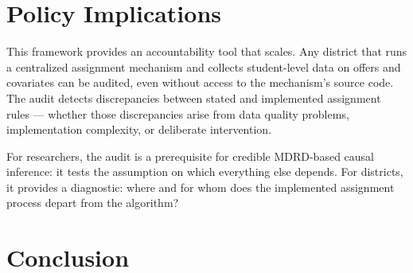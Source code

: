 \documentclass[12pt,a4paper,dvipsnames]{article}
\begin{document}
\section{Policy Implications}

This framework provides an accountability tool that scales. Any district that runs a centralized assignment mechanism and collects student-level data on offers and covariates can be audited, even without access to the mechanism's source code. The audit detects discrepancies between stated and implemented assignment rules --- whether those discrepancies arise from data quality problems, implementation complexity, or deliberate intervention.

For researchers, the audit is a prerequisite for credible MDRD-based causal inference: it tests the assumption on which everything else depends. For districts, it provides a diagnostic: where and for whom does the implemented assignment process depart from the algorithm?

\section{Conclusion}


\newpage
\printbibliography

\end{document}
